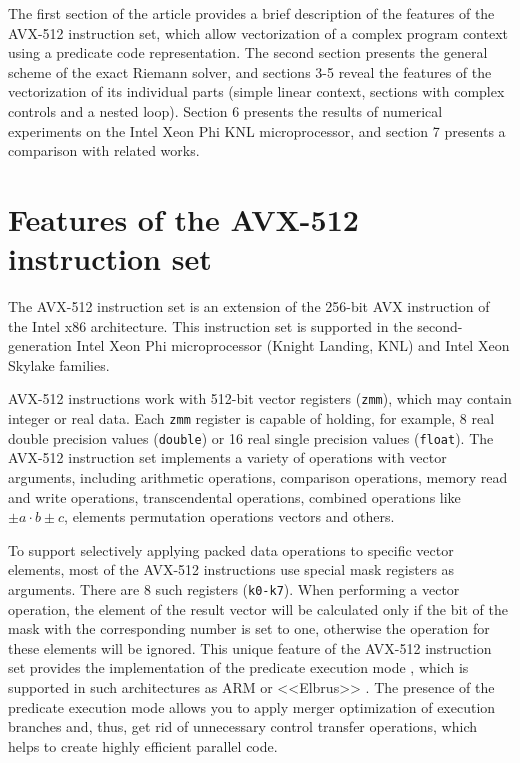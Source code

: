 \documentclass[utf8,english]{psta}%
\begin{document}
The first section of the article provides a brief description of the features of the AVX-512 instruction set, which allow vectorization of a complex program context using a predicate code representation.
The second section presents the general scheme of the exact Riemann solver, and sections 3-5 reveal the features of the vectorization of its individual parts (simple linear context, sections with complex controls and a nested loop).
Section 6 presents the results of numerical experiments on the Intel Xeon Phi KNL microprocessor, and section 7 presents a comparison with related works.

\section{Features of the AVX-512 instruction set}

The AVX-512 instruction set is an extension of the 256-bit AVX instruction of the Intel x86 architecture.
This instruction set is supported in the second-generation Intel Xeon Phi microprocessor (Knight Landing, KNL) and Intel Xeon Skylake families.

AVX-512 instructions work with 512-bit vector registers (\texttt{zmm}), which may contain integer or real data.
Each \texttt{zmm} register is capable of holding, for example, 8 real double precision values (\texttt{double}) or 16 real single precision values (\texttt{float}).
The AVX-512 instruction set implements a variety of operations with vector arguments, including arithmetic operations, comparison operations, memory read and write operations, transcendental operations, combined operations like $\pm a \cdot b \pm c$, elements permutation operations vectors and others.

To support selectively applying packed data operations to specific vector elements, most of the AVX-512 instructions use special mask registers as arguments.
There are 8 such registers (\texttt{k0-k7}).
When performing a vector operation, the element of the result vector will be calculated only if the bit of the mask with the corresponding number is set to one, otherwise the operation for these elements will be ignored.
This unique feature of the AVX-512 instruction set provides the implementation of the predicate execution mode \cite{VolOkuPred}, which is supported in such architectures as ARM or <<Elbrus>> \cite{KimElbrus}.
The presence of the predicate execution mode allows you to apply merger optimization of execution branches and, thus, get rid of unnecessary control transfer operations, which helps to create highly efficient parallel code.
\end{document}
